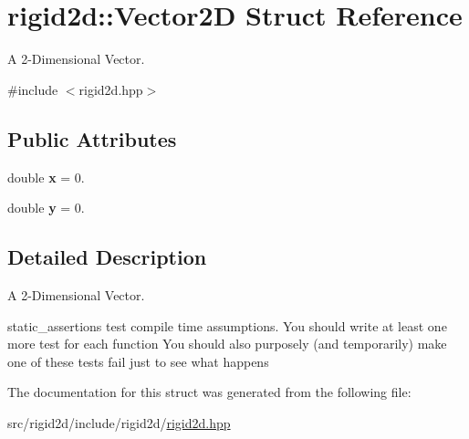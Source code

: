 \hypertarget{structrigid2d_1_1Vector2D}{}\section{rigid2d\+:\+:Vector2D Struct Reference}
\label{structrigid2d_1_1Vector2D}


A 2-\/\+Dimensional Vector.  




{\ttfamily \#include $<$rigid2d.\+hpp$>$}

\subsection*{Public Attributes}
\begin{DoxyCompactItemize}
\item 
\mbox{\label{structrigid2d_1_1Vector2D_a1876d655fe2da548c4813777c450845c}} 
double {\bfseries x} = 0.
\item 
\mbox{\label{structrigid2d_1_1Vector2D_aa814ea37ffe4a161b0020609580e4d17}} 
double {\bfseries y} = 0.
\end{DoxyCompactItemize}


\subsection{Detailed Description}
A 2-\/\+Dimensional Vector. 

static\+\_\+assertions test compile time assumptions. You should write at least one more test for each function You should also purposely (and temporarily) make one of these tests fail just to see what happens 

The documentation for this struct was generated from the following file\+:\begin{DoxyCompactItemize}
\item 
src/rigid2d/include/rigid2d/\hyperlink{rigid2d_8hpp}{rigid2d.\+hpp}\end{DoxyCompactItemize}

